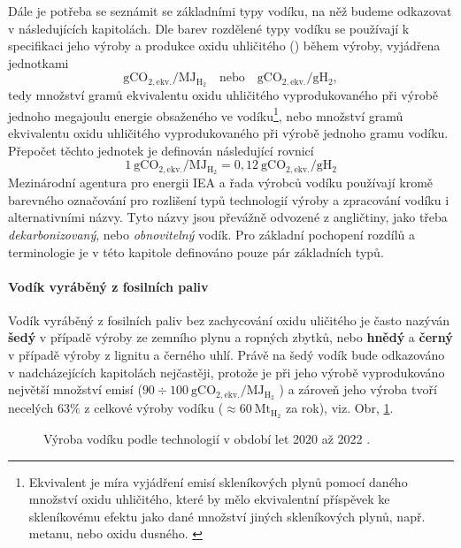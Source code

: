 Dále je potřeba se seznámit se základními typy vodíku, na něž budeme odkazovat v následujících kapitolách. Dle barev rozdělené typy vodíku se používají k specifikaci jeho výroby a produkce oxidu uhličitého () během výroby, vyjádřena jednotkami
\begin{equation*}
    \mathrm{gCO_{2,ekv.}}/\mathrm{MJ_{H_2}} \quad \mathrm{nebo} \quad \mathrm{gCO_{2,ekv.}}/\mathrm{gH_2},
\end{equation*}
tedy množství gramů ekvivalentu oxidu uhličitého vyprodukovaného při výrobě jednoho megajoulu energie obsaženého ve vodíku\footnote{Ekvivalent  je míra vyjádření emisí skleníkových plynů pomocí daného množství oxidu uhličitého, které by mělo ekvivalentní příspěvek ke skleníkovému efektu jako dané množství jiných skleníkových plynů, např. metanu, nebo oxidu dusného. \cite{Trebicky2016}}, nebo množství gramů ekvivalentu oxidu uhličitého vyprodukovaného při výrobě jednoho gramu vodíku. Přepočet těchto jednotek je definován následující rovnicí \cite{Gericke2022}
\begin{equation}
    1\ \mathrm{gCO_{2,ekv.}}/\mathrm{MJ_{H_2}} = 0,\!12\ \mathrm{gCO_{2,ekv.}}/\mathrm{gH_2}
\end{equation}
Mezinárodní agentura pro energii \acs{IEA} a řada výrobců vodíku používají kromě barevného označování pro rozlišení typů technologií výroby a zpracování vodíku i alternativními názvy. Tyto názvy jsou převážně odvozené z angličtiny, jako třeba \textit{dekarbonizovaný}, nebo \textit{obnovitelný} vodík. Pro základní pochopení rozdílů a terminologie je v této kapitole definováno pouze pár základních typů.

\paragraph{Vodík vyráběný z fosilních paliv}
Vodík vyráběný z fosilních paliv bez zachycování oxidu uličitého je často nazýván \textbf{šedý} v případě výroby ze zemního plynu a ropných zbytků, nebo \textbf{hnědý} a \textbf{černý} v případě výroby z lignitu a černého uhlí. \cite{Griffiths2021} Právě na šedý vodík bude odkazováno v nadcházejících kapitolách nejčastěji, protože je při jeho výrobě vyprodukováno největší množství emisí ($90 \div 100\ \mathrm{gCO_{2,ekv.}}/\mathrm{MJ_{H_2}}$ \cite{Barth2016}) a zároveň jeho výroba tvoří necelých $63\%$ z celkové výroby vodíku ($\approx 60\ \mathrm{Mt_{H_2}}$ za rok), viz. Obr, \ref{fig:produkceH2}. \cite{IEAreview}
\begin{figure}[ht]
    \centering
    
    \caption[Výroba vodíku podle technologií v období let 2020 až 2022]{Výroba vodíku podle technologií v období let 2020 až 2022 \cite{IEAreview}.} \label{fig:produkceH2}
\end{figure}

